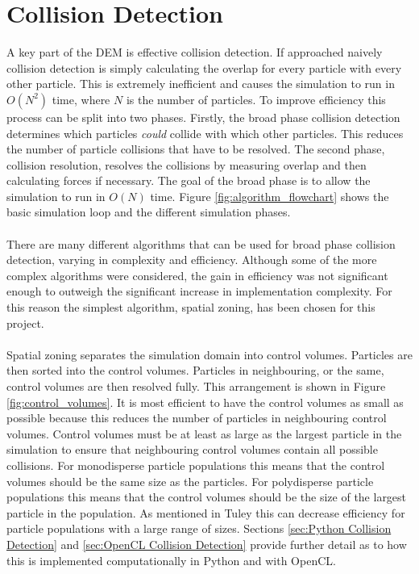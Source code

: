 \documentclass[a4paper,11pt,titlepage]{report}
\begin{document}
\section{Collision Detection}
\label{sec:collision detection}
A key part of the DEM is effective collision detection. If approached naively collision detection is simply calculating the overlap for every particle with every other particle. This is extremely inefficient and causes the simulation to run in $O(N^2)$ time, where $N$ is the number of particles. To improve efficiency this process can be split into two phases. Firstly, the broad phase collision detection determines which particles \textit{could} collide with which other particles. This reduces the number of particle collisions that have to be resolved. The second phase, collision resolution, resolves the collisions by measuring overlap and then calculating forces if necessary. The goal of the broad phase is to allow the simulation to run in $O(N)$ time. Figure \ref{fig:algorithm_flowchart} shows the basic simulation loop and the different simulation phases.
\\\\There are many different algorithms that can be used for broad phase collision detection, varying in complexity and efficiency. Although some of the more complex algorithms were considered, the gain in efficiency was not significant enough to outweigh the significant increase in implementation complexity. For this reason the simplest algorithm, spatial zoning, has been chosen for this project.
\\\\Spatial zoning separates the simulation domain into control volumes. Particles are then sorted into the control volumes. Particles in neighbouring, or the same, control volumes are then resolved fully. This arrangement is shown in Figure \ref{fig:control_volumes}. It is most efficient to have the control volumes as small as possible because this reduces the number of particles in neighbouring control volumes. Control volumes must be at least as large as the largest particle in the simulation to ensure that neighbouring control volumes contain all possible collisions. For monodisperse particle populations this means that the control volumes should be the same size as the particles. For polydisperse particle populations this means that the control volumes should be the size of the largest particle in the population. As mentioned in Tuley\cite{tuley} this can decrease efficiency for particle populations with a large range of sizes. Sections \ref{sec:Python Collision Detection} and \ref{sec:OpenCL Collision Detection} provide further detail as to how this is implemented computationally in Python and with OpenCL.
\end{document}
